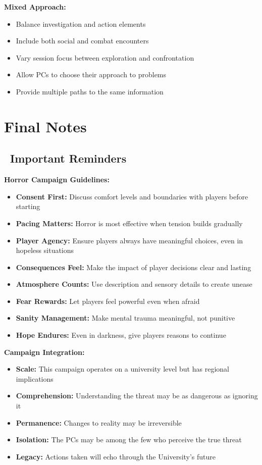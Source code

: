 \documentclass[11pt]{article}
\begin{document}
\textbf{Mixed Approach:}
\begin{itemize}
    \item Balance investigation and action elements
    \item Include both social and combat encounters
    \item Vary session focus between exploration and confrontation
    \item Allow PCs to choose their approach to problems
    \item Provide multiple paths to the same information
\end{itemize}

\section{Final Notes}

\subsection*{\faExclamationTriangle\ Important Reminders}

\textbf{Horror Campaign Guidelines:}
\begin{itemize}
    \item \textbf{Consent First:} Discuss comfort levels and boundaries with players before starting
    \item \textbf{Pacing Matters:} Horror is most effective when tension builds gradually
    \item \textbf{Player Agency:} Ensure players always have meaningful choices, even in hopeless situations
    \item \textbf{Consequences Feel:} Make the impact of player decisions clear and lasting
    \item \textbf{Atmosphere Counts:} Use description and sensory details to create unease
    \item \textbf{Fear Rewards:} Let players feel powerful even when afraid
    \item \textbf{Sanity Management:} Make mental trauma meaningful, not punitive
    \item \textbf{Hope Endures:} Even in darkness, give players reasons to continue
\end{itemize}

\textbf{Campaign Integration:}
\begin{itemize}
    \item \textbf{Scale:} This campaign operates on a university level but has regional implications
    \item \textbf{Comprehension:} Understanding the threat may be as dangerous as ignoring it
    \item \textbf{Permanence:} Changes to reality may be irreversible
    \item \textbf{Isolation:} The PCs may be among the few who perceive the true threat
    \item \textbf{Legacy:} Actions taken will echo through the University's future
\end{itemize}
\end{document}
